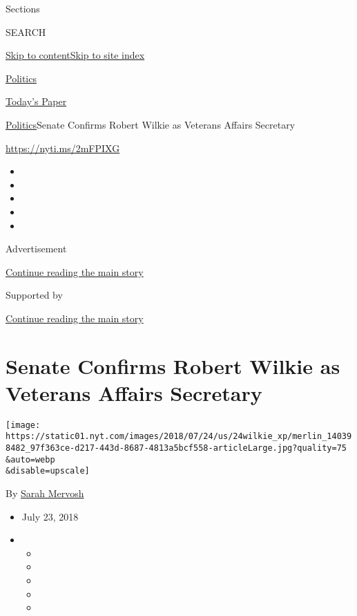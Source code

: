 Sections

SEARCH

\protect\hyperlink{site-content}{Skip to
content}\protect\hyperlink{site-index}{Skip to site index}

\href{https://www.nytimes.com/section/politics}{Politics}

\href{https://myaccount.nytimes.com/auth/login?response_type=cookie\&client_id=vi}{}

\href{https://www.nytimes.com/section/todayspaper}{Today's Paper}

\href{/section/politics}{Politics}\textbar{}Senate Confirms Robert
Wilkie as Veterans Affairs Secretary

\url{https://nyti.ms/2mFPIXG}

\begin{itemize}
\item
\item
\item
\item
\item
\end{itemize}

Advertisement

\protect\hyperlink{after-top}{Continue reading the main story}

Supported by

\protect\hyperlink{after-sponsor}{Continue reading the main story}

\hypertarget{senate-confirms-robert-wilkie-as-veterans-affairs-secretary}{%
\section{Senate Confirms Robert Wilkie as Veterans Affairs
Secretary}\label{senate-confirms-robert-wilkie-as-veterans-affairs-secretary}}

\texttt{[image: https://static01.nyt.com/images/2018/07/24/us/24wilkie\_xp/merlin\_140398482\_97f363ce-d217-443d-8687-4813a5bcf558-articleLarge.jpg?quality=75\\\&auto=webp\\\&disable=upscale]}

By \href{https://www.nytimes.com/by/sarah-mervosh}{Sarah Mervosh}

\begin{itemize}
\item
  July 23, 2018
\item
  \begin{itemize}
  \item
  \item
  \item
  \item
  \item
  \end{itemize}
\end{itemize}

